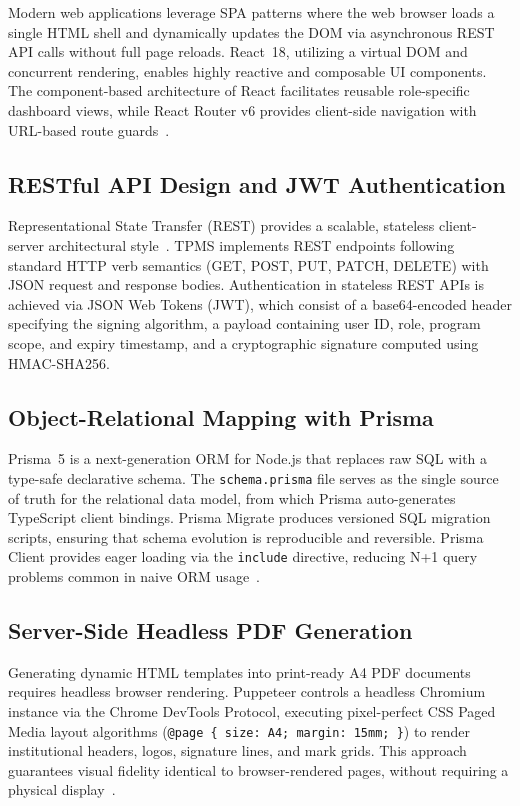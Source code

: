 \documentclass[12pt]{report}
\begin{document}
Modern web applications leverage SPA patterns where the web browser loads a single HTML shell and dynamically updates the DOM via asynchronous REST API calls without full page reloads. React~18, utilizing a virtual DOM and concurrent rendering, enables highly reactive and composable UI components. The component-based architecture of React facilitates reusable role-specific dashboard views, while React Router v6 provides client-side navigation with URL-based route guards~\citep{react2024}.

\subsection{RESTful API Design and JWT Authentication}

Representational State Transfer (REST) provides a scalable, stateless client-server architectural style~\citep{fielding2000architectural}. TPMS implements REST endpoints following standard HTTP verb semantics (GET, POST, PUT, PATCH, DELETE) with JSON request and response bodies. Authentication in stateless REST APIs is achieved via JSON Web Tokens (JWT), which consist of a base64-encoded header specifying the signing algorithm, a payload containing user ID, role, program scope, and expiry timestamp, and a cryptographic signature computed using HMAC-SHA256.

\subsection{Object-Relational Mapping with Prisma}

Prisma~5 is a next-generation ORM for Node.js that replaces raw SQL with a type-safe declarative schema. The \texttt{schema.prisma} file serves as the single source of truth for the relational data model, from which Prisma auto-generates TypeScript client bindings. Prisma Migrate produces versioned SQL migration scripts, ensuring that schema evolution is reproducible and reversible. Prisma Client provides eager loading via the \texttt{include} directive, reducing N+1 query problems common in naive ORM usage~\citep{prisma2024}.

\subsection{Server-Side Headless PDF Generation}

Generating dynamic HTML templates into print-ready A4 PDF documents requires headless browser rendering. Puppeteer controls a headless Chromium instance via the Chrome DevTools Protocol, executing pixel-perfect CSS Paged Media layout algorithms (\texttt{@page \{ size: A4; margin: 15mm; \}}) to render institutional headers, logos, signature lines, and mark grids. This approach guarantees visual fidelity identical to browser-rendered pages, without requiring a physical display~\citep{puppeteer2024}.
\end{document}
